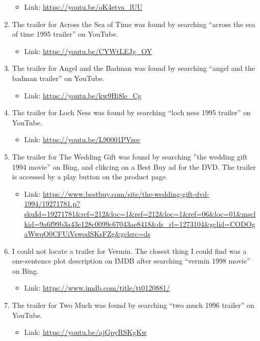 \documentclass[12pt]{article}
\begin{document}
\begin{enumerate}
    \begin{itemize}
        \item Link: \url{https://youtu.be/oK4etva_lUU}
    \end{itemize}
    \item The trailer for Across the Sea of Time was found by searching ``across the sea of time 1995 trailer'' on YouTube.
    \begin{itemize}
        \item Link: \url{https://youtu.be/CYWtLEJg_OY}
    \end{itemize}
    \item The trailer for Angel and the Badman was found by searching ``angel and the badman trailer'' on YouTube.
    \begin{itemize}
        \item Link: \url{https://youtu.be/kw9Hi8le_Cg}
    \end{itemize}
    \item The trailer for Loch Ness was found by searching ``loch ness 1995 trailer'' on YouTube.
    \begin{itemize}
        \item Link: \url{https://youtu.be/L90001PVzec}
    \end{itemize}
    \item The trailer for The Wedding Gift was found by searching ''the wedding gift 1994 movie'' on Bing, and clikcing on a Best Buy ad for the DVD.  The trailer is accessed by a play button on the product page.
    \begin{itemize}
        \item Link: \url{https://www.bestbuy.com/site/the-wedding-gift-dvd-1994/19271781.p?skuId=19271781&ref=212&loc=1&ref=212&loc=1&ref=06&loc=01&msclkid=9a6f99b3a43e128c0099c67043ae8418&ds_rl=1273104&gclid=CODOgaWwqO0CFUiVswodSKsFZg&gclsrc=ds}
    \end{itemize}
    \item I could not locate a trailer for Vermin.  The closest thing I could find was a one-sentence plot description on IMDB after searching ``vermin 1998 movie'' on Bing.
    \begin{itemize}
        \item Link: \url{https://www.imdb.com/title/tt0120881/}
    \end{itemize}
    \item The trailer for Two Much was found by searching ``two much 1996 trailer'' on YouTube.
    \begin{itemize}
        \item Link: \url{https://youtu.be/ajGpyRSKgKw}

\end{itemize}
\end{enumerate}
\end{document}
